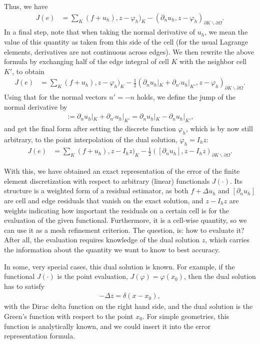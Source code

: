 \documentclass{article}
\begin{document}
Thus, we have 
\begin{align*}
  J(e)
  &=
  \sum_K (f+u_h), z-\varphi_h)_K
  - (\partial_n u_h, z-\varphi_h)_{\partial K\backslash \partial\Omega}.
\end{align*}
In a final step, note that when taking the normal derivative of $u_h$, we mean
the value of this quantity as taken from this side of the cell (for the usual
Lagrange elements, derivatives are not continuous across edges). We then
rewrite the above formula by exchanging half of the edge integral of cell $K$
with the neighbor cell $K'$, to obtain
\begin{align*}
  J(e)
  &=
  \sum_K (f+u_h), z-\varphi_h)_K
  - \frac 12 (\partial_n u_h|_K + \partial_{n'} u_h|_{K'},
              z-\varphi_h)_{\partial K\backslash \partial\Omega}.  
\end{align*}
Using that for the normal vectors $n'=-n$ holds, we define the jump of the
normal derivative by
\begin{gather*}
  [\partial_n u_h] := \partial_n u_h|_K + \partial_{n'} u_h|_{K'}
  =
  \partial_n u_h|_K - \partial_n u_h|_{K'},
\end{gather*}
and get the final form after setting the discrete function $\varphi_h$, which
is by now still arbitrary, to the point interpolation of the dual solution,
$\varphi_h=I_h z$:
\begin{align*}
  J(e)
  &=
  \sum_K (f+u_h), z-I_h z)_K
  - \frac 12 ([\partial_n u_h],
              z-I_h z)_{\partial K\backslash \partial\Omega}.  
\end{align*}

With this, we have obtained an exact representation of the error of the finite
element discretization with respect to arbitrary (linear) functionals
$J(\cdot)$. Its structure is a weighted form of a residual estimator, as both
$f+\Delta u_h$ and $[\partial_n u_h]$ are cell and edge residuals that vanish
on the exact solution, and $z-I_h z$ are weights indicating how important the
residuals on a certain cell is for the evaluation of the given functional.
Furthermore, it is a cell-wise quantity, so we can use it as a mesh refinement
criterion. The question, is: how to evaluate it? After all, the evaluation
requires knowledge of the dual solution $z$, which carries the information
about the quantity we want to know to best accuracy.

In some, very special cases, this dual solution is known. For example, if the
functional $J(\cdot)$ is the point evaluation, $J(\varphi)=\varphi(x_0)$, then
the dual solution has to satisfy
\begin{gather*}
  -\Delta z = \delta(x-x_0),
\end{gather*}
with the Dirac delta function on the right hand side, and the dual solution is
the Green's function with respect to the point $x_0$. For simple geometries,
this function is analytically known, and we could insert it into the error
representation formula.
\end{document}
